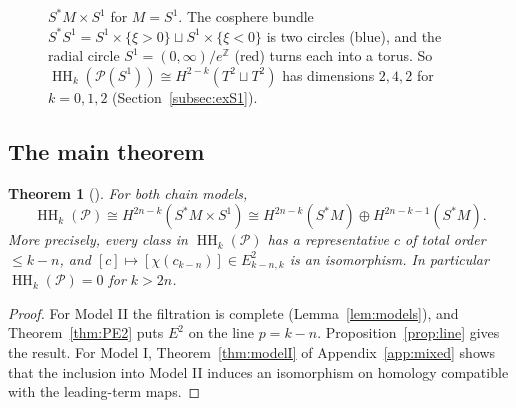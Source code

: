 \documentclass[11pt,oneside,reqno]{article}
\DeclareMathOperator{\HH}{HH}
\newcommand{\Z}{\mathbb Z}
\newcommand{\cP}{\mathcal P}
\theoremstyle{plain}
\newtheorem{theorem}{Theorem}[section]
\theoremstyle{definition}
\theoremstyle{remark}
\begin{document}
\begin{figure}[htbp]
\centering
{}
\caption[\(S^*M\times S^1\) for the circle]{\(S^*M\times S^1\) for \(M=S^1\). The cosphere bundle
\(S^*S^1=S^1\times\{\xi>0\}\sqcup S^1\times\{\xi<0\}\) is two circles (blue), and the radial
circle \(S^1=(0,\infty)/e^{\Z}\) (red) turns each into a torus. So \(\HH_k(\cP(S^1))\cong
H^{2-k}(T^2\sqcup T^2)\) has dimensions \(2,4,2\) for \(k=0,1,2\)
(Section~\ref{subsec:exS1}).}
\label{fig:SMS1}
\end{figure}

\subsection{The main theorem}\label{subsec:mainHH}

\begin{theorem}[{\cite[\S4, Theorem (1)]{BG}}]\label{thm:HHP}
For both chain models,
\[
 \HH_k(\cP)\cong H^{2n-k}(S^*M\times S^1)\cong H^{2n-k}(S^*M)\oplus H^{2n-k-1}(S^*M).
\]
More precisely, every class in \(\HH_k(\cP)\) has a representative \(c\) of total order
\(\le k-n\), and \([c]\mapsto[\chi(c_{k-n})]\in E^2_{k-n,k}\) is an isomorphism. In
particular \(\HH_k(\cP)=0\) for \(k>2n\).
\end{theorem}

\begin{proof}
For Model II the filtration is complete (Lemma~\ref{lem:models}), and
Theorem~\ref{thm:PE2} puts \(E^2\) on the line \(p=k-n\). Proposition~\ref{prop:line}
gives the result. For Model I, Theorem~\ref{thm:modelI} of
Appendix~\ref{app:mixed} shows that the inclusion into Model II induces an
isomorphism on homology compatible with the leading-term maps.
\end{proof}
\end{document}

